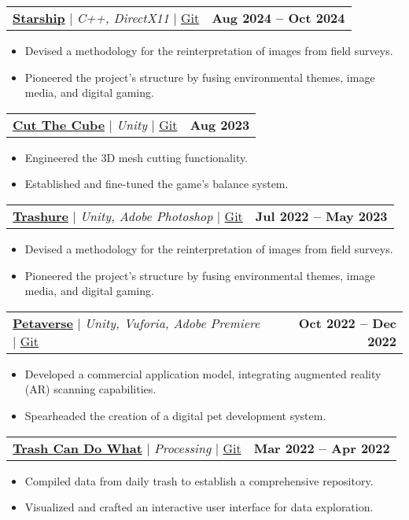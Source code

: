 \documentclass[letterpaper,11pt]{article}
\makeatletter
\newcommand{\resumeItem}[1]{
    \item\small{
            {#1 \vspace{-2pt}}
    }
}
\newcommand{\resumeProjectHeading}[2]{
    \item
    \begin{tabular*}{1.001\textwidth}{l@{\extracolsep{\fill}}r}
    \small#1 & \textbf{\small #2}\\
    \end{tabular*}\vspace{-7pt}
}
\newcommand{\resumeItemListStart}{\begin{itemize}}
\newcommand{\resumeItemListEnd}{\end{itemize}\vspace{-5pt}}
\makeatother
\begin{document}
\vspace{-12pt}

\resumeProjectHeading
{\textbf{\href{https://dadavidtseng.info/gamedev0002_trashure/}{Starship}} $|$ \emph{C++, DirectX11} $|$ \href{https://github.com/dadavidtseng/Trashure_V3}{Git}}{Aug 2024 -- Oct 2024}
\resumeItemListStart
\resumeItem{Devised a methodology for the reinterpretation of images from field surveys.}
\resumeItem{Pioneered the project's structure by fusing environmental themes, image media, and digital gaming.}
\resumeItemListEnd

\vspace{-12pt}

\resumeProjectHeading
{\textbf{\href{https://dadavidtseng.info/gamedev0003_cutthecube/}{Cut The Cube}} $|$ \emph{Unity} $|$
\href{https://github.com/dadavidtseng/CutTheCube}{Git}}{Aug 2023}
\resumeItemListStart
\resumeItem{Engineered the 3D mesh cutting functionality.}
\resumeItem{Established and fine-tuned the game's balance system.}
\resumeItemListEnd

\vspace{-12pt}

\resumeProjectHeading
{\textbf{\href{https://dadavidtseng.info/gamedev0002_trashure/}{Trashure}} $|$ \emph{Unity, Adobe Photoshop} $|$ \href{https://github.com/dadavidtseng/Trashure_V3}{Git}}{Jul 2022 -- May 2023}
\resumeItemListStart
\resumeItem{Devised a methodology for the reinterpretation of images from field surveys.}
\resumeItem{Pioneered the project's structure by fusing environmental themes, image media, and digital gaming.}
\resumeItemListEnd

\vspace{-12pt}

\resumeProjectHeading
{\textbf{\href{https://dadavidtseng.info/gamedev0001_petaverse/}{Petaverse}} $|$ \emph{Unity, Vuforia, Adobe Premiere} $|$ \href{https://github.com/dadavidtseng/Petaverse}{Git}}
{Oct 2022 -- Dec 2022}
\resumeItemListStart
\resumeItem{Developed a commercial application model, integrating augmented reality (AR) scanning capabilities.}
\resumeItem{Spearheaded the creation of a digital pet development system.}
\resumeItemListEnd

\vspace{-12pt}

\resumeProjectHeading
{\textbf{\href{https://dadavidtseng.info/architecture0003_trashcandowhat/}{Trash Can Do What}} $|$ \emph{Processing} $|$ \href{https://github.com/dadavidtseng/TrashCanDoWhat}{Git}}{Mar 2022 -- Apr 2022}
\resumeItemListStart
\resumeItem{Compiled data from daily trash to establish a comprehensive repository.}
\resumeItem{Visualized and crafted an interactive user interface for data exploration.}
\resumeItemListEnd
\end{document}
